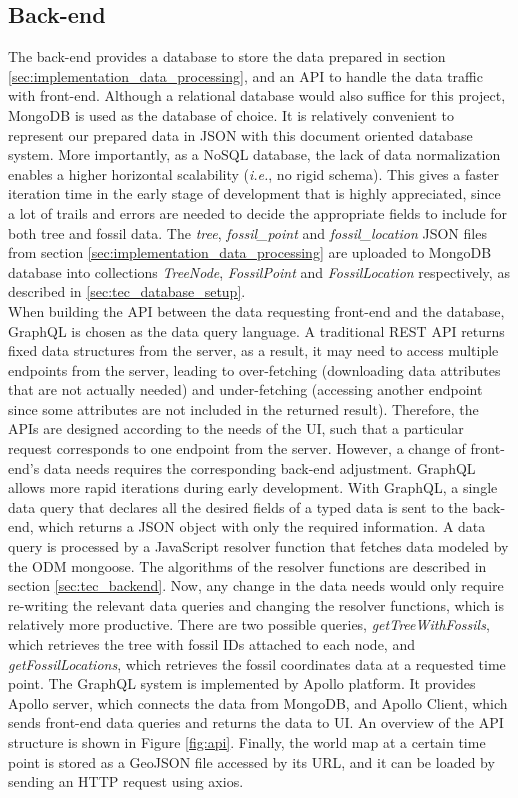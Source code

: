\documentclass[11pt, a4paper,oneside,chapterprefix=false]{scrbook}
\begin{document}
\subsection{Back-end} \label{subsec: implementation_backend}
The back-end provides a database to store the data prepared in section \ref{sec:implementation_data_processing}, and an API to handle the data traffic with front-end. Although a relational database would also suffice for this project, MongoDB is used as the database of choice. It is relatively convenient to represent our prepared data in JSON with this document oriented database system. More importantly, as a NoSQL database, the lack of data normalization enables a higher horizontal scalability (\emph{i.e.}, no rigid schema). This gives a faster iteration time in the early stage of development that is highly appreciated, since a lot of trails and errors are needed to decide the appropriate fields to include for both tree and fossil data. The \emph{tree}, \emph{fossil\_point} and \emph{fossil\_location} JSON files from section \ref{sec:implementation_data_processing} are uploaded to MongoDB database into collections \emph{TreeNode}, \emph{FossilPoint} and \emph{FossilLocation} respectively, as described in \ref{sec:tec_database_setup}.\\

When building the API between the data requesting front-end and the database, GraphQL is chosen as the data query language. A traditional REST API returns fixed data structures from the server, as a result, it may need to access multiple endpoints from the server, leading to over-fetching (downloading data attributes that are not actually needed) and under-fetching (accessing another endpoint since some attributes are not included in the returned result). Therefore, the APIs are designed according to the needs of the UI, such that a particular request corresponds to one endpoint from the server. However, a change of front-end's data needs requires the corresponding back-end adjustment. GraphQL allows more rapid iterations during early development. With GraphQL, a single data query that declares all the desired fields of a typed data is sent to the back-end, which returns a JSON object with only the required information. A data query is processed by a JavaScript resolver function that fetches data modeled by the ODM mongoose. The algorithms of the resolver functions are described in section \ref{sec:tec_backend}. Now, any change in the data needs would only require re-writing the relevant data queries and changing the resolver functions, which is relatively more productive. There are two possible queries, \emph{getTreeWithFossils}, which retrieves the tree with fossil IDs attached to each node, and \emph{getFossilLocations}, which retrieves the fossil coordinates data at a requested time point. The GraphQL system is implemented by Apollo platform. It provides Apollo server, which connects the data from MongoDB, and Apollo Client, which sends front-end data queries and returns the data to UI. An overview of the API structure is shown in Figure \ref{fig:api}. Finally, the world map at a certain time point is stored as a GeoJSON file accessed by its URL, and it can be loaded by sending an HTTP request using axios. \\
\end{document}
